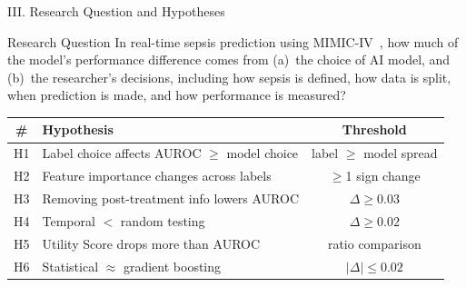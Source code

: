 \begin{frame}{III. Research Question and Hypotheses}
\begin{block}{Research Question}
  In real-time sepsis prediction using MIMIC-IV~\cite{johnson2023mimiciv},
  how much of the model's performance difference comes from
  (a)~the choice of AI model, and (b)~the researcher's decisions, including
  how sepsis is defined, how data is split, when prediction is made, and how
  performance is measured?
\end{block}

\vspace{4pt}
\begin{center}\tablestyle
\begin{tabular}{clc}
\toprule
\textbf{\#} & \textbf{Hypothesis} & \textbf{Threshold} \\
\midrule
H1 & Label choice affects AUROC $\geq$ model choice
   & label $\geq$ model spread \\
H2 & Feature importance changes across labels
   & $\geq$1 sign change \\
H3 & Removing post-treatment info lowers AUROC
   & $\Delta \geq 0.03$ \\
H4 & Temporal $<$ random testing
   & $\Delta \geq 0.02$ \\
H5 & Utility Score drops more than AUROC
   & ratio comparison \\
H6 & Statistical $\approx$ gradient boosting
   & $|\Delta| \leq 0.02$ \\
\bottomrule
\end{tabular}
\end{center}
\end{frame}
